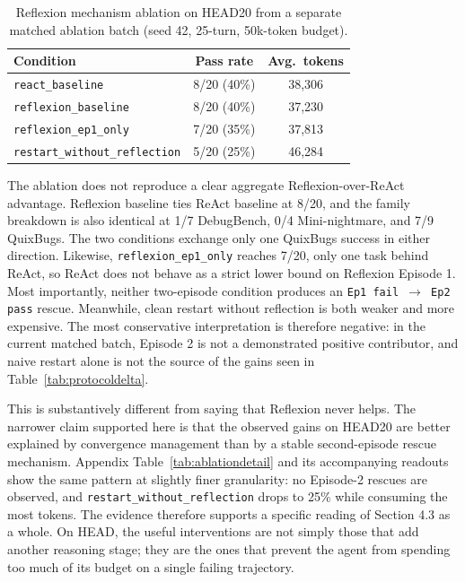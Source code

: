 \documentclass{article}
\begin{document}
\begin{table}[t]
\centering
\caption{Reflexion mechanism ablation on HEAD20 from a separate matched ablation batch (seed 42, 25-turn, 50k-token budget).}
\label{tab:ablation}
\begin{tabular}{lcc}
\toprule
Condition & Pass rate & Avg.\ tokens \\
\midrule
\texttt{react\_baseline} & 8/20 (40\%) & 38{,}306 \\
\texttt{reflexion\_baseline} & 8/20 (40\%) & 37{,}230 \\
\texttt{reflexion\_ep1\_only} & 7/20 (35\%) & 37{,}813 \\
\texttt{restart\_without\_reflection} & 5/20 (25\%) & 46{,}284 \\
\bottomrule
\end{tabular}
\end{table}

The ablation does not reproduce a clear aggregate Reflexion-over-ReAct advantage. Reflexion baseline ties ReAct baseline at 8/20, and the family breakdown is also identical at 1/7 DebugBench, 0/4 Mini-nightmare, and 7/9 QuixBugs. The two conditions exchange only one QuixBugs success in either direction. Likewise, \texttt{reflexion\_ep1\_only} reaches 7/20, only one task behind ReAct, so ReAct does not behave as a strict lower bound on Reflexion Episode 1. Most importantly, neither two-episode condition produces an \texttt{Ep1 fail $\rightarrow$ Ep2 pass} rescue. Meanwhile, clean restart without reflection is both weaker and more expensive. The most conservative interpretation is therefore negative: in the current matched batch, Episode 2 is not a demonstrated positive contributor, and naive restart alone is not the source of the gains seen in Table~\ref{tab:protocoldelta}.

This is substantively different from saying that Reflexion never helps. The narrower claim supported here is that the observed gains on HEAD20 are better explained by convergence management than by a stable second-episode rescue mechanism. Appendix Table~\ref{tab:ablationdetail} and its accompanying readouts show the same pattern at slightly finer granularity: no Episode-2 rescues are observed, and \texttt{restart\_without\_reflection} drops to 25\% while consuming the most tokens. The evidence therefore supports a specific reading of Section 4.3 as a whole. On HEAD, the useful interventions are not simply those that add another reasoning stage; they are the ones that prevent the agent from spending too much of its budget on a single failing trajectory.
\end{document}
